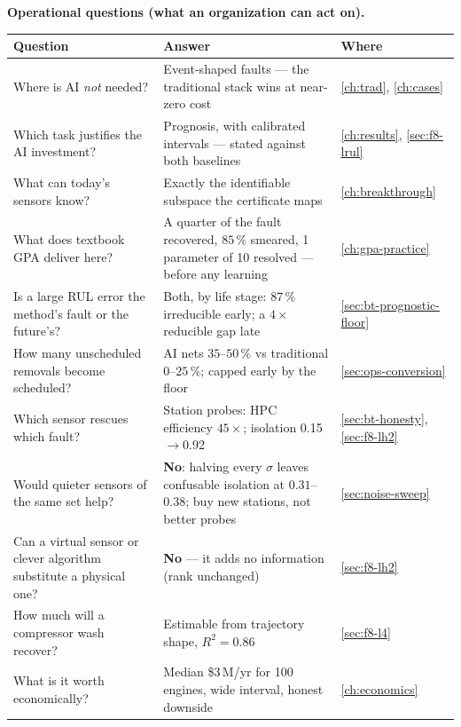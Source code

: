 \begin{center}\footnotesize
\setlength{\tabcolsep}{4pt}
\textbf{Operational questions (what an organization can act on).}\\[2pt]
\begin{tabular}{@{}>{\raggedright\arraybackslash}p{}>{\raggedright\arraybackslash}p{}>{\raggedright\arraybackslash}p{}@{}}
  \toprule
  Question & Answer & Where \\
  \midrule
  Where is AI \emph{not} needed? & Event-shaped faults --- the traditional stack wins at
    near-zero cost & \cref{ch:trad}, \cref{ch:cases} \\
  Which task justifies the AI investment? & Prognosis, with calibrated intervals ---
    stated against both baselines & \cref{ch:results}, \cref{sec:f8-lrul} \\
  What can today's sensors know? & Exactly the identifiable subspace the certificate maps &
    \cref{ch:breakthrough} \\
  What does textbook GPA deliver here? & A quarter of the fault recovered, $85\,\%$ smeared,
    1 parameter of 10 resolved --- before any learning & \cref{ch:gpa-practice} \\
  Is a large RUL error the method's fault or the future's? & Both, by life stage: $87\,\%$
    irreducible early; a $4\times$ reducible gap late & \cref{sec:bt-prognostic-floor} \\
  How many unscheduled removals become scheduled? & AI nets $35$--$50\,\%$ vs traditional
    $0$--$25\,\%$; capped early by the floor & \cref{sec:ops-conversion} \\
  Which sensor rescues which fault? & Station probes: HPC efficiency $45\times$; isolation
    0.15$\to$0.92 & \cref{sec:bt-honesty}, \cref{sec:f8-lh2} \\
  Would quieter sensors of the same set help? & \textbf{No}: halving every $\sigma$ leaves
    confusable isolation at $0.31$--$0.38$; buy new stations, not better probes &
    \cref{sec:noise-sweep} \\
  Can a virtual sensor or clever algorithm substitute a physical one? & \textbf{No} --- it
    adds no information (rank unchanged) & \cref{sec:f8-lh2} \\
  How much will a compressor wash recover? & Estimable from trajectory shape, $R^2=0.86$ &
    \cref{sec:f8-l4} \\
  What is it worth economically? & Median \$3\,M/yr for 100 engines, wide interval, honest
    downside & \cref{ch:economics} \\
  \bottomrule
\end{tabular}
\end{center}

